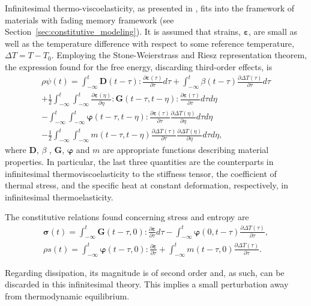 Infinitesimal thermo-viscoelasticity, as presented in \cite{christensen2013theory}, fits into the framework of materials with fading memory framework (see Section~\ref{sec:constitutive_modeling}).
It is assumed that strains, $\bm \varepsilon$, are small as well as the temperature difference with respect to some reference temperature, $\Delta T=T-T_0$.
Employing the Stone-Weierstrass and Riesz representation theorem, the expression found for the free energy, discarding third-order effects, is
\begin{multline}
  \rho\psi(t) = \int_{-\infty}^t \bm D(t-\tau):\frac{\partial \bm\varepsilon(\tau)}{\partial \tau}d\tau + \int_{-\infty}^t \beta(t-\tau)\frac{\partial \Delta T(\tau)}{\partial \tau}d\tau\\ + \frac{1}{2}\int_{-\infty}^t\int_{-\infty}^t \frac{\partial \bm\varepsilon(\eta)}{\partial \eta}:\bm G(t-\tau, t-\eta):\frac{\partial \bm \varepsilon(\tau)}{\partial \tau}d\tau d\eta  \\
  -\int_{-\infty}^t \int_{-\infty}^t \bm\varphi(t-\tau, t-\eta):\frac{\partial \bm\varepsilon(\tau)}{\partial \tau} \frac{\partial \Delta T(\eta)}{\partial \eta} d \tau d \eta\\
  -\frac{1}{2} \int_{-\infty}^t \int_{-\infty}^t m(t-\tau, t-\eta) \frac{\partial \Delta T(\tau)}{\partial \tau} \frac{\partial \Delta T(\eta)}{\partial \eta} d \tau d \eta,
  \end{multline}
where $\bm D$, $\beta$ , $\bm G$, $\bm \varphi$ and $m$ are appropriate functions describing  material properties.
In particular, the last three quantities are the counterparts in infinitesimal thermoviscoelasticity to the stiffness tensor, the coefficient of thermal stress, and the specific heat at constant deformation, respectively, in infinitesimal thermoelasticity.

The constitutive relations found concerning stress and entropy are
\begin{gather}
  \bm \sigma(t) = \int_{-\infty}^t \bm G(t-\tau, 0):\frac{\partial\bm\varepsilon}{\partial \tau} d\tau-\int_{-\infty}^t \bm\varphi(0, t-\tau)\frac{\partial \Delta T(\tau)}{\partial \tau},\\
  \rho s(t) = \int_{-\infty}^t \bm\varphi(t-\tau, 0):\frac{\partial \bm \varepsilon}{\partial \tau} + \int_{-\infty}^t m(t-\tau, 0)\frac{\partial \Delta T(\tau)}{\partial \tau}.
\end{gather}

Regarding dissipation, its magnitude is of second order and, as such, can be discarded in this infinitesimal theory.
This implies a small perturbation away from thermodynamic equilibrium.

